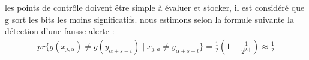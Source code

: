 	\bigskip
	
	les points de contrôle doivent être simple à évaluer et stocker, il est considéré que g sort les bits les moins significatifs. nous estimons selon la formule suivante la détection d'une fausse alerte :
\begin{align*}
pr\{g(x_{j,\alpha}) \neq g(y_{\alpha +s-t}) \mid x_{j,a} \neq y_{\alpha+s-t}\}=\frac{1}{2}(1-\frac{1}{2^{\mid k \mid}}) \approx \frac{1}{2}
\end{align*}




	



\endinput{}
